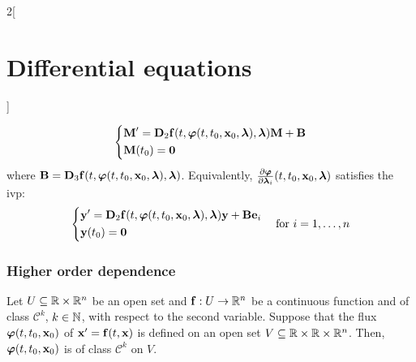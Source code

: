 \documentclass[../../../main.tex]{subfiles}
\begin{document}
\begin{multicols}{2}[\section{Differential equations}]
\begin{theorem}
    \begin{equation*}
      \left\{
      \begin{aligned}
         & \boldsymbol{\mathrm{M}}'      =\boldsymbol{\mathrm{D}}_2\boldsymbol{\mathrm{f}}(t,\boldsymbol{\mathrm{\varphi}}(t,t_0,\boldsymbol{\mathrm{x}}_0,\boldsymbol{\mathrm{\lambda}}),\boldsymbol{\mathrm{\lambda}})\boldsymbol{\mathrm{M}}+ \boldsymbol{\mathrm{B}} \\
         & \boldsymbol{\mathrm{M}}(t_0)  =\boldsymbol{\mathrm{0}}
      \end{aligned}
      \right.
    \end{equation*}
    where $\boldsymbol{\mathrm{B}}=\boldsymbol{\mathrm{D}}_3\boldsymbol{\mathrm{f}}(t,\boldsymbol{\mathrm{\varphi}}(t,t_0,\boldsymbol{\mathrm{x}}_0,\boldsymbol{\mathrm{\lambda}}),\boldsymbol{\mathrm{\lambda}})$. Equivalently, $\frac{\partial\boldsymbol{\mathrm{\varphi}}}{\partial \boldsymbol{\mathrm{\lambda}}_i}(t,t_0,\boldsymbol{\mathrm{x}}_0,\boldsymbol{\mathrm{\lambda}})$ satisfies the ivp:
    $$
      \left\{
      \begin{aligned}
         & \boldsymbol{\mathrm{y}}'      =\boldsymbol{\mathrm{D}}_2\boldsymbol{\mathrm{f}}(t,\boldsymbol{\mathrm{\varphi}}(t,t_0,\boldsymbol{\mathrm{x}}_0,\boldsymbol{\mathrm{\lambda}}),\boldsymbol{\mathrm{\lambda}})\boldsymbol{\mathrm{y}}+\boldsymbol{\mathrm{B}}\boldsymbol{\mathrm{e}}_i \\
         & \boldsymbol{\mathrm{y}}(t_0)  =\boldsymbol{\mathrm{0}}
      \end{aligned}
      \right.\quad\text{for }i=1,\ldots,n
    $$
  \end{theorem}
  \subsubsection{Higher order dependence}
  \begin{theorem}
    Let $U\subseteq\mathbb{R}\times\mathbb{R}^n$ be an open set and $\boldsymbol{\mathrm{f}}:U\rightarrow\mathbb{R}^n$ be a continuous function and of class $\mathcal{C}^k$, $k\in\mathbb{N}$, with respect to the second variable. Suppose that the flux $\boldsymbol{\mathrm{\varphi}}(t,t_0,\boldsymbol{\mathrm{x}}_0)$ of $\boldsymbol{\mathrm{x}}'=\boldsymbol{\mathrm{f}}(t,\boldsymbol{\mathrm{x}})$ is defined on an open set $V\subseteq\mathbb{R}\times\mathbb{R}\times\mathbb{R}^n$. Then, $\boldsymbol{\mathrm{\varphi}}(t,t_0,\boldsymbol{\mathrm{x}}_0)$ is of class $\mathcal{C}^k$ on $V$.
  \end{theorem}
\end{multicols}
\end{document}
